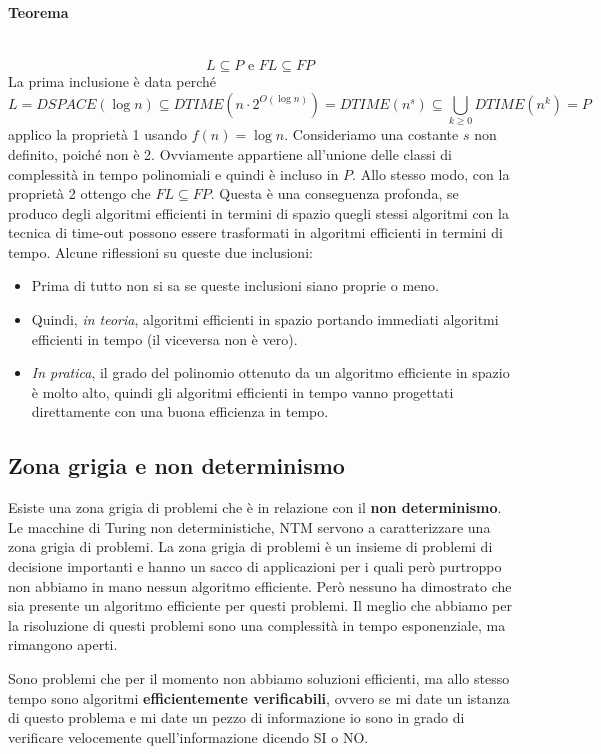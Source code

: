 \documentclass{article}
\begin{document}
\paragraph{Teorema}\mbox{}\\
$$L\subseteq P\text{ e }FL\subseteq FP$$
La prima inclusione è data perché
$$L=DSPACE(\log n)\subseteq DTIME(n\cdot 2^{O(\log n)})=DTIME(n^s)\subseteq \bigcup_{k\geq 0}DTIME(n^k)=P$$
applico la proprietà 1 usando $f(n)=\log n$. Consideriamo una costante $s$ non definito,
poiché non è 2. Ovviamente appartiene all'unione delle classi di complessità in tempo polinomiali
e quindi è incluso in $P$. Allo stesso modo, con la proprietà 2 ottengo che $FL\subseteq FP$.
Questa è una conseguenza profonda, se produco degli algoritmi efficienti in termini di spazio
quegli stessi algoritmi con la tecnica di time-out possono essere trasformati in algoritmi efficienti
in termini di tempo.
Alcune riflessioni su queste due inclusioni:
\begin{itemize}
    \item Prima di tutto non si sa se queste inclusioni siano proprie o meno.
    \item Quindi, \textit{in teoria}, algoritmi efficienti in spazio portando immediati
    algoritmi efficienti in tempo (il viceversa non è vero).
    \item \textit{In pratica}, il grado del polinomio ottenuto da un algoritmo efficiente
    in spazio è molto alto, quindi gli algoritmi efficienti in tempo vanno progettati
    direttamente con una buona efficienza in tempo.
\end{itemize}

\subsection{Zona grigia e non determinismo}
Esiste una zona grigia di problemi che è in relazione con il \textbf{non determinismo}. Le macchine
di Turing non deterministiche, NTM servono a caratterizzare una zona grigia di problemi.
La zona grigia di problemi è un insieme di problemi di decisione importanti e hanno un sacco di applicazioni
per i quali però purtroppo non abbiamo in mano nessun algoritmo efficiente. Però nessuno ha dimostrato
che sia presente un algoritmo efficiente per questi problemi. Il meglio che abbiamo per la risoluzione
di questi problemi sono una complessità in tempo esponenziale, ma rimangono aperti.

Sono problemi che per il momento non abbiamo soluzioni efficienti, ma allo stesso tempo sono algoritmi
\textbf{efficientemente verificabili}, ovvero se mi date un istanza di questo problema e mi date un
pezzo di informazione io sono in grado di verificare velocemente quell'informazione dicendo SI o NO.
\end{document}
